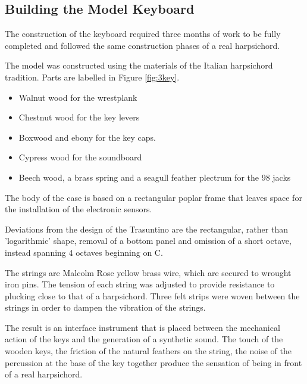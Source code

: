 

\subsection{Building the Model Keyboard}\label{keyboard}

The construction of the keyboard required three months of work to be fully completed
and followed the same construction phases of a real harpsichord.

The model was constructed using the materials of the Italian harpsichord
tradition. Parts are labelled in Figure \ref{fig:3key}.

\begin{itemize}
\item
  Walnut wood for the wrestplank
\item
  Chestnut wood for the key levers
\item
  Boxwood and ebony for the key caps.
\item
  Cypress wood for the soundboard
\item
  Beech wood, a brass spring and a seagull feather plectrum for the 98 jacks
\end{itemize}

The body of the case is based on a rectangular poplar frame that leaves space
for the installation of the electronic sensors.

Deviations from the design of the Trasuntino are the rectangular, rather than
'logarithmic' shape, removal of a bottom panel and omission of a short octave,
instead spanning 4 octaves beginning on C.

The strings are Malcolm Rose yellow brass wire, which are secured to wrought
iron pins. The tension of each string was adjusted to provide resistance to
plucking close to that of a harpsichord. Three felt strips were woven between
the strings in order to dampen the vibration of the strings.

The result is an interface instrument that is placed between the mechanical
action of the keys and the generation of a synthetic sound. The touch of the
wooden keys, the friction of the natural feathers on the string, the noise of
the percussion at the base of the key together produce the sensation of being in
front of a real harpsichord.


